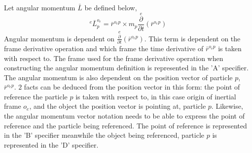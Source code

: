 \documentclass[class=report, 12pt, crop=false]{standalone}
\begin{document}
\begin{center}
Let angular momentum $\bar{L}$ be defined below,
$${}^{e}\bar{L}^{o_{e}}_{p} = \bar{r}^{o_{e}p}\times m_{p}\overset{e}{\frac{\partial}{\partial t}}\left(\bar{r}^{o_{e}p}\right)$$
Angular momentum is dependent on $\displaystyle \overset{e}{\frac{\partial}{\partial t}}\left(\bar{r}^{o_{e}p}\right)$. This term is dependent on the frame derivative operation and which frame the time derivative of $\displaystyle \bar{r}^{o_{e}p}$ is taken with respect to. The frame used for the frame derivative operation when constructing the angular momentum definition is represented in the 'A' specifier. The angular momentum is also dependent on the position vector of particle $p$, $\displaystyle \bar{r}^{o_{e}p}$. $2$ facts can be deduced from the position vector in this form: the point of reference the particle $p$ is taken with respect to, in this case origin of inertial frame $o_{e}$, and the object the position vector is pointing at, particle $p$. Likewise, the angular momentum vector notation needs to be able to express the point of reference and the particle being referenced. The point of reference is represented in the 'B' specifier meanwhile the object being referenced, particle $p$ is represented in the 'D' specifier.


\end{center}
\end{document}
